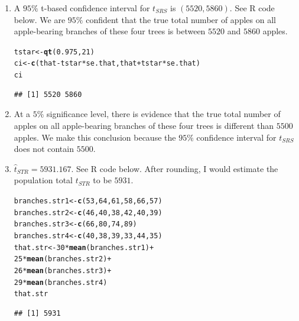 \documentclass[12pt]{article}\usepackage[]{graphicx}\usepackage[]{color}
\makeatletter
\newcommand{\hlnum}[1]{\textcolor[rgb]{0.686,0.059,0.569}{#1}}%
\newcommand{\hlopt}[1]{\textcolor[rgb]{0,0,0}{#1}}%
\newcommand{\hlstd}[1]{\textcolor[rgb]{0.345,0.345,0.345}{#1}}%
\newcommand{\hlkwb}[1]{\textcolor[rgb]{0.69,0.353,0.396}{#1}}%
\newcommand{\hlkwd}[1]{\textcolor[rgb]{0.737,0.353,0.396}{\textbf{#1}}}%
\newenvironment{kframe}{%
 \def\at@end@of@kframe{}%
 \ifinner\ifhmode%
  \def\at@end@of@kframe{\end{minipage}}%
  \begin{minipage}{\columnwidth}%
 \fi\fi%
 \def\FrameCommand##1{\hskip\@totalleftmargin \hskip-\fboxsep
 \colorbox{shadecolor}{##1}\hskip-\fboxsep
     \hskip-\linewidth \hskip-\@totalleftmargin \hskip\columnwidth}%
 \MakeFramed {\advance\hsize-\width
   \@totalleftmargin\z@ \linewidth\hsize
   \@setminipage}}%
 {\par\unskip\endMakeFramed%
 \at@end@of@kframe}
\newenvironment{knitrout}{}{} %
\makeatother
\begin{document}
\begin{doublespacing}
\begin{enumerate}
\begin{enumerate}
\item A $95\%$ t-based confidence interval for $t_{SRS}$ is $(5520, 5860)$. See R code below. We are $95\%$ confident that the true total number of apples on all apple-bearing branches of these four trees is between $5520$ and $5860$ apples.

\begin{knitrout}\footnotesize
{}\color{fgcolor}\begin{kframe}
\begin{alltt}
\hlstd{tstar} \hlkwb{<-} \hlkwd{qt}\hlstd{(}\hlnum{0.975}\hlstd{,} \hlnum{21}\hlstd{)}
\hlstd{ci} \hlkwb{<-} \hlkwd{c}\hlstd{(that}\hlopt{-}\hlstd{tstar}\hlopt{*}\hlstd{se.that, that}\hlopt{+}\hlstd{tstar}\hlopt{*}\hlstd{se.that)}
\hlstd{ci}
\end{alltt}
\begin{verbatim}
## [1] 5520 5860
\end{verbatim}
\end{kframe}
\end{knitrout}

\item At a $5\%$ significance level, there is evidence that the true total number of apples on all apple-bearing branches of these four trees is different than $5500$ apples. We make this conclusion because the $95\%$ confidence interval for $t_{SRS}$ does not contain $5500$. 

\item $\hat{t}_{STR} = 5931.167$. See R code below. After rounding, I would estimate the population total $t_{STR}$ to be $5931$. 

\begin{knitrout}\footnotesize
{}\color{fgcolor}\begin{kframe}
\begin{alltt}
\hlstd{branches.str1} \hlkwb{<-} \hlkwd{c}\hlstd{(}\hlnum{53}\hlstd{,} \hlnum{64}\hlstd{,} \hlnum{61}\hlstd{,} \hlnum{58}\hlstd{,} \hlnum{66}\hlstd{,} \hlnum{57}\hlstd{)}
\hlstd{branches.str2} \hlkwb{<-} \hlkwd{c}\hlstd{(}\hlnum{46}\hlstd{,} \hlnum{40}\hlstd{,} \hlnum{38}\hlstd{,} \hlnum{42}\hlstd{,} \hlnum{40}\hlstd{,} \hlnum{39}\hlstd{)}
\hlstd{branches.str3} \hlkwb{<-} \hlkwd{c}\hlstd{(}\hlnum{66}\hlstd{,} \hlnum{80}\hlstd{,} \hlnum{74}\hlstd{,} \hlnum{89}\hlstd{)}
\hlstd{branches.str4} \hlkwb{<-} \hlkwd{c}\hlstd{(}\hlnum{40}\hlstd{,} \hlnum{38}\hlstd{,} \hlnum{39}\hlstd{,} \hlnum{33}\hlstd{,} \hlnum{44}\hlstd{,} \hlnum{35}\hlstd{)}
\hlstd{that.str} \hlkwb{<-} \hlnum{30}\hlopt{*}\hlkwd{mean}\hlstd{(branches.str1)}\hlopt{+}
            \hlnum{25}\hlopt{*}\hlkwd{mean}\hlstd{(branches.str2)}\hlopt{+}
            \hlnum{26}\hlopt{*}\hlkwd{mean}\hlstd{(branches.str3)}\hlopt{+}
            \hlnum{29}\hlopt{*}\hlkwd{mean}\hlstd{(branches.str4)}
\hlstd{that.str}
\end{alltt}
\begin{verbatim}
## [1] 5931
\end{verbatim}
\end{kframe}
\end{knitrout}


\end{enumerate}
\end{enumerate}
\end{doublespacing}
\end{document}
